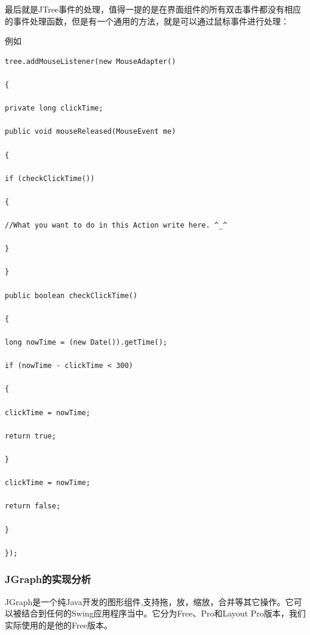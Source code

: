 \documentclass[a4paper,unicode=true,xetex]{article}
\begin{document}
最后就是JTree事件的处理，值得一提的是在界面组件的所有双击事件都没有相应的事件处理函数，但是有一个通用的方法，就是可以通过鼠标事件进行处理：

例如
\begin{lstlisting}
tree.addMouseListener(new MouseAdapter()

{

private long clickTime;

public void mouseReleased(MouseEvent me)

{

if (checkClickTime())

{

//What you want to do in this Action write here. ^_^

}

}

public boolean checkClickTime()

{

long nowTime = (new Date()).getTime();

if (nowTime - clickTime < 300)

{

clickTime = nowTime;

return true;

}

clickTime = nowTime;

return false;

}

});
\end{lstlisting}

\subsubsection{JGraph的实现分析}

JGraph是一个纯Java开发的图形组件,支持拖，放，缩放，合并等其它操作。它可以被结合到任何的Swing应用程序当中。它分为Free、Pro和Layout Pro版本，我们实际使用的是他的Free版本。
\end{document}
